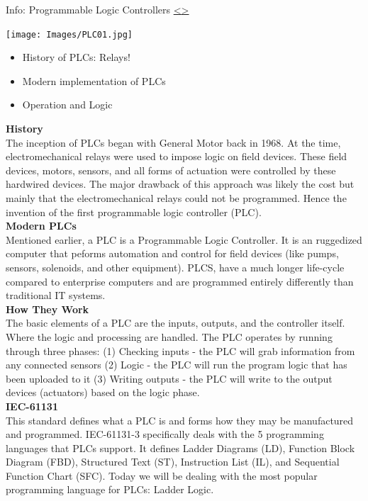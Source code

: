 \documentclass[12pt]{extarticle}
\newenvironment{instructionblock}{\Large\bgroup}{\egroup}
\newcommand{\bi}{\begin{itemize}}
\newcommand{\ei}{\end{itemize}}
\newcounter{next}
\newcounter{prev}
\begin{document}

\pagebreak
{}
\begin{slide}{Info: Programmable Logic Controllers }{\hyperref[slide \theprev]{\textless}\hyperref[slide \thenext]{\textgreater}}
\begin{instructionblock}
	\begin{center}
		\texttt{[image: Images/PLC01.jpg]}
	\end{center}
\bi
	\item History of PLCs: Relays!
	\item Modern implementation of PLCs
	\item Operation and Logic
\ei
\end{instructionblock}
\end{slide}
\vfill
\noindent
\textbf{History}\\
The inception of PLCs began with General Motor back in 1968. At the time, electromechanical relays were used to impose logic on field devices. These field devices, motors, sensors, and all forms of actuation were controlled by these hardwired devices. The major drawback of this approach was likely the cost but mainly that the electromechanical relays could not be programmed. Hence the invention of the first programmable logic controller (PLC). \cite[p.123]{KnappLangill} \\
\textbf{Modern PLCs}\\
Mentioned earlier, a PLC is a Programmable Logic Controller. It is an ruggedized computer that peforms automation and control for field devices (like pumps, sensors, solenoids, and other equipment). PLCS, have a much longer life-cycle compared to enterprise computers and are programmed entirely differently than traditional IT systems. \cite[p.123]{KnappLangill} \\
\textbf{How They Work}\\
The basic elements of a PLC are the inputs, outputs, and the controller itself. Where the logic and processing are handled. The PLC operates by running through three phases: (1) Checking inputs - the PLC will grab information from any connected sensors (2) Logic - the PLC will run the program logic that has been uploaded to it (3) Writing outputs - the PLC will write to the output devices (actuators) based on the logic phase. \cite{OP_plcs}\\
\textbf{IEC-61131}\\
This standard defines what a PLC is and forms how they may be manufactured and programmed. IEC-61131-3 specifically deals with the 5 programming languages that PLCs support. It defines Ladder Diagrams (LD), Function Block Diagram (FBD), Structured Text (ST), Instruction List (IL), and Sequential Function Chart (SFC). Today we will be dealing with the most popular programming language for PLCs: Ladder Logic.
\end{document}
